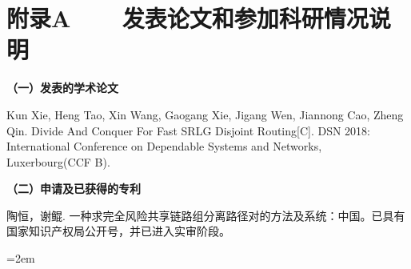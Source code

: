 
\chapter*{附录A~~~~发表论文和参加科研情况说明}
\setlength{\parindent}{0em}
\textbf{（一）发表的学术论文}
\begin{publist}
\item Kun Xie, Heng Tao, Xin Wang, Gaogang Xie, Jigang Wen, Jiannong Cao, Zheng Qin. Divide And Conquer For Fast SRLG Disjoint Routing[C]. DSN 2018: International Conference on Dependable Systems and Networks, Luxerbourg(CCF B).
\end{publist}

\vspace*{1em}
\textbf{（二）申请及已获得的专利}
\begin{publist}
\item 陶恒，谢鲲. 一种求完全风险共享链路组分离路径对的方法及系统：中国。已具有国家知识产权局公开号，并已进入实审阶段。
\end{publist}
\vfill
{}\hangindent=2em\noindent

\setlength{\parindent}{2em}
